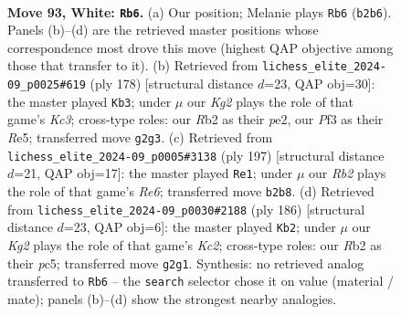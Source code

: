 \documentclass[11pt]{article}
\begin{document}
\clearpage

\begin{figure}[p]\centering
\begin{subfigure}{0.46\textwidth}\centering
\resizebox{\linewidth}{!}{%
\newchessgame
\chessboard[
  setfen={8/7R/4pp2/4k3/P1r1P3/5P2/1R4K1/8 w - - 12 93},
  showmover=false,
  pgfstyle=straightmove, color=movearrow, markmove={b2-b6}
]}
\caption{}
\end{subfigure}\hfill
\begin{subfigure}{0.46\textwidth}\centering
\resizebox{\linewidth}{!}{%
\newchessgame
\chessboard[
  setfen={8/7p/p5kP/4R3/PP6/2K5/r3p3/8 w - - 2 90},
  showmover=false,
  pgfstyle=straightmove, color=movearrow, markmove={c3-b3}
]}
\caption{}
\end{subfigure}
\\[4pt]
\begin{subfigure}{0.46\textwidth}\centering
\resizebox{\linewidth}{!}{%
\newchessgame
\chessboard[
  setfen={8/4R2p/6pP/3k2P1/4p1K1/4r3/8/8 b - - 3 99},
  showmover=false,
  pgfstyle=straightmove, color=movearrow, markmove={e3-e1}
]}
\caption{}
\end{subfigure}\hfill
\begin{subfigure}{0.46\textwidth}\centering
\resizebox{\linewidth}{!}{%
\newchessgame
\chessboard[
  setfen={8/P5R1/2k5/2pp4/5p2/r4P2/2K2P2/8 w - - 0 94},
  showmover=false,
  pgfstyle=straightmove, color=movearrow, markmove={c2-b2}
]}
\caption{}
\end{subfigure}
\caption{\textbf{Move 93, White: \texttt{Rb6}.} (a) Our position; Melanie plays \texttt{Rb6} (\texttt{b2b6}). Panels (b)--(d) are the retrieved master positions whose correspondence most drove this move (highest QAP objective among those that transfer to it). (b) Retrieved from \texttt{lichess\_elite\_2024-09\_p0025\#619} (ply 178) [structural distance $d$=23, QAP obj=30]: the master played \texttt{Kb3}; under $\mu$ our \emph{Kg2} plays the role of that game's \emph{Kc3}; cross-type roles: our \emph{R}b2 as their \emph{p}e2, our \emph{P}f3 as their \emph{R}e5; transferred move \texttt{g2g3}. (c) Retrieved from \texttt{lichess\_elite\_2024-09\_p0005\#3138} (ply 197) [structural distance $d$=21, QAP obj=17]: the master played \texttt{Re1}; under $\mu$ our \emph{Rb2} plays the role of that game's \emph{Re6}; transferred move \texttt{b2b8}. (d) Retrieved from \texttt{lichess\_elite\_2024-09\_p0030\#2188} (ply 186) [structural distance $d$=23, QAP obj=6]: the master played \texttt{Kb2}; under $\mu$ our \emph{Kg2} plays the role of that game's \emph{Kc2}; cross-type roles: our \emph{R}b2 as their \emph{p}c5; transferred move \texttt{g2g1}. Synthesis: no retrieved analog transferred to \texttt{Rb6} -- the \texttt{search} selector chose it on value (material / mate); panels (b)--(d) show the strongest nearby analogies.}
\label{fig:thought-m184}
\end{figure}
\end{document}
